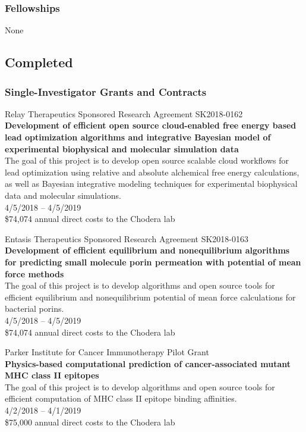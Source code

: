 \documentclass[10pt]{article}
\begin{document}
\subsubsection*{Fellowships}

None

\eject
\subsection*{Completed}

\subsubsection*{Single-Investigator Grants and Contracts}

Relay Therapeutics Sponsored Research Agreement SK2018-0162 \\
{\bf Development of efficient open source cloud-enabled free energy based lead optimization algorithms and integrative Bayesian model of experimental biophysical and molecular simulation data} \\
The goal of this project is to develop open source scalable cloud workflows for lead optimization using relative and absolute alchemical free energy calculations, as well as Bayesian integrative modeling techniques for experimental biophysical data and molecular simulations. \\
4/5/2018 -- 4/5/2019 \\
\$74,074 annual direct costs to the Chodera lab

\vspace{1.5ex}

Entasis Therapeutics Sponsored Research Agreement SK2018-0163 \\
{\bf Development of efficient equilibrium and nonequilibrium algorithms for predicting small molecule porin permeation with potential of mean force methods} \\
The goal of this project is to develop algorithms and open source tools for efficient equilibrium and nonequilibrium potential of mean force calculations for bacterial porins.\\
4/5/2018 -- 4/5/2019 \\
\$74,074 annual direct costs to the Chodera lab

\vspace{1.5ex}

Parker Institute for Cancer Immunotherapy Pilot Grant \\
{\bf Physics-based computational prediction of cancer-associated mutant MHC class II epitopes} \\
The goal of this project is to develop algorithms and open source tools for efficient computation of MHC class II epitope binding affinities.\\
4/2/2018 -- 4/1/2019 \\
\$75,000 annual direct costs to the Chodera lab
\end{document}
